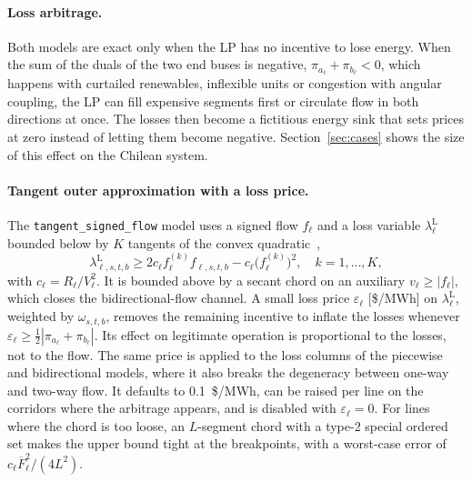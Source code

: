 \paragraph{Loss arbitrage.}
Both models are exact only when the LP has no incentive to lose
energy.  When the sum of the duals of the two end buses is negative,
$\pi_{a_\ell} + \pi_{b_\ell} < 0$, which happens with curtailed
renewables, inflexible units or congestion with angular coupling, the
LP can fill expensive segments first or circulate flow in both
directions at once.  The losses then become a fictitious energy sink
that sets prices at zero instead of letting them become negative.
Section~\ref{sec:cases} shows the size of this effect on the Chilean
system.

\paragraph{Tangent outer approximation with a loss price.}
The \texttt{tangent\_signed\_flow} model uses a signed flow
$f_\ell$ and a loss variable $\lambda^{\mathrm{L}}_\ell$ bounded below
by $K$ tangents of the convex quadratic~\cite{coffrin2014lpac},
\begin{equation}
\label{eq:loss_tangent}
\lambda^{\mathrm{L}}_{\ell,s,t,b} \geq 2 c_\ell f^{(k)}_\ell
  f_{\ell,s,t,b} - c_\ell \bigl(f^{(k)}_\ell\bigr)^2,
  \quad k = 1,\dots,K,
\end{equation}
with $c_\ell = R_\ell/V_\ell^2$.  It is bounded above by a secant chord
on an auxiliary $v_\ell \geq |f_\ell|$, which closes the
bidirectional-flow channel.  A small loss price $\varepsilon_\ell$
[\$/MWh] on $\lambda^{\mathrm{L}}_\ell$, weighted by
$\omega_{s,t,b}$, removes the remaining incentive to inflate the losses
whenever $\varepsilon_\ell \geq \tfrac12 |\pi_{a_\ell}+\pi_{b_\ell}|$.
Its effect on legitimate operation is proportional to the losses, not to
the flow.  The same price is applied to the loss columns of the
piecewise and bidirectional models, where it also breaks the degeneracy
between one-way and two-way flow.  It defaults to 0.1~\$/MWh, can be
raised per line on the corridors where the arbitrage appears, and is
disabled with $\varepsilon_\ell = 0$.
For lines where the chord is too loose, an $L$-segment chord
with a type-2 special ordered set makes the upper bound tight at the
breakpoints, with a worst-case error of
$c_\ell \overline{F}_\ell^2/(4L^2)$.

